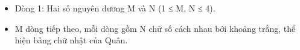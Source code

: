 \begin{itemize}
	\item Dòng 1: Hai số nguyên dương M và N (1 ≤ M, N ≤ 4).
	\item M dòng tiếp theo, mỗi dòng gồm N chữ số cách nhau bởi khoảng trắng, thể hiện bảng chữ nhật của Quân.
\end{itemize}

\